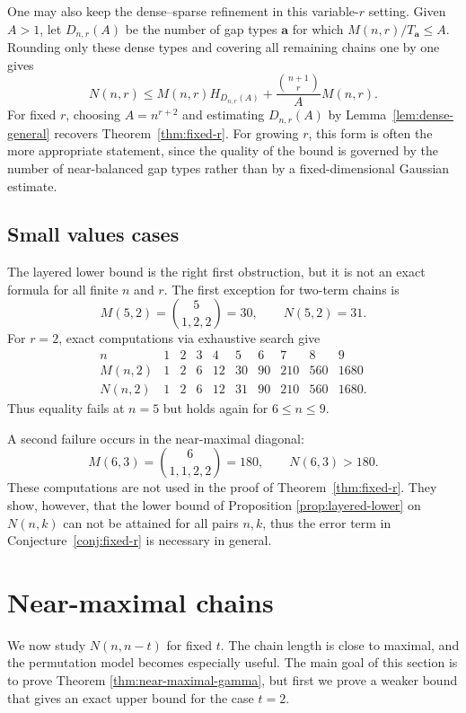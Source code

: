 \documentclass[11pt]{article}
\theoremstyle{definition}
\theoremstyle{remark}
\newcommand{\balazs}[1]{\textcolor{red}{Balazs: #1}}
\begin{document}
One may also keep the dense--sparse refinement in this variable-\(r\) setting. Given \(A>1\), let \(D_{n,r}(A)\) be the number of gap types \(\mathbf a\) for which \(M(n,r)/T_{\mathbf a}\le A\). Rounding only these dense types and covering all remaining chains one by one gives
\[
N(n,r)
\le M(n,r)H_{D_{n,r}(A)}
+ \frac{\binom{n+1}{r}}{A}M(n,r).
\]
For fixed \(r\), choosing \(A=n^{r+2}\) and estimating \(D_{n,r}(A)\) by Lemma~\ref{lem:dense-general} recovers Theorem~\ref{thm:fixed-r}. For growing \(r\), this form is often the more appropriate statement, since the quality of the bound is governed by the number of near-balanced gap types rather than by a fixed-dimensional Gaussian estimate.

\subsection{Small values cases}\label{sec:small-values}

The layered lower bound is the right first obstruction, but it is not an exact formula for all finite $n$ and $r$.  The first exception for two-term chains is
\[
   M(5,2)=\binom{5}{1,2,2}=30,
   \qquad
   N(5,2)=31.
\]
For $r=2$, exact computations via exhaustive search give
\[
\begin{array}{c|ccccccccc}
 n        &1&2&3&4&5&6&7&8&9\\
\hline
 M(n,2)   &1&2&6&12&30&90&210&560&1680\\
 N(n,2)   &1&2&6&12&31&90&210&560&1680.
\end{array}
\]
Thus equality fails at $n=5$ but holds again for $6\le n\le 9$.

A second failure occurs in the near-maximal diagonal:
\[
   M(6,3)=\binom{6}{1,1,2,2}=180,
   \qquad
   N(6,3)>180.
\]
These computations are not used in the proof of Theorem~\ref{thm:fixed-r}.  They show, however, that the lower bound of Proposition \ref{prop:layered-lower} on $N(n,k)$ can not be attained for all pairs $n,k$, thus the error term in Conjecture~\ref{conj:fixed-r} is necessary in general. %

\section{Near-maximal chains}\label{sec:nearmax}

We now study $N(n,n-t)$ for fixed $t$.  The chain length is close to maximal, and the permutation model becomes especially useful. The main goal of this section is to prove Theorem \ref{thm:near-maximal-gamma}, but first we prove a weaker bound that gives an exact upper bound for the case $t=2$.
\end{document}
